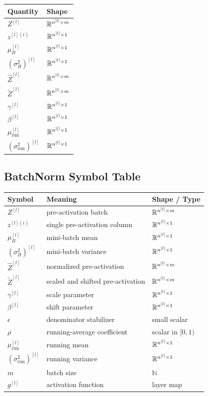 \begin{center}
\begin{tabular}{ll}
\toprule
Quantity & Shape \\
\midrule
$Z^{[l]}$ & $\mathbb{R}^{n^{[l]} \times m}$ \\
$z^{[l](i)}$ & $\mathbb{R}^{n^{[l]} \times 1}$ \\
$\mu_B^{[l]}$ & $\mathbb{R}^{n^{[l]} \times 1}$ \\
$(\sigma_B^2)^{[l]}$ & $\mathbb{R}^{n^{[l]} \times 1}$ \\
$\widehat{Z}^{[l]}$ & $\mathbb{R}^{n^{[l]} \times m}$ \\
$\widetilde{Z}^{[l]}$ & $\mathbb{R}^{n^{[l]} \times m}$ \\
$\gamma^{[l]}$ & $\mathbb{R}^{n^{[l]} \times 1}$ \\
$\beta^{[l]}$ & $\mathbb{R}^{n^{[l]} \times 1}$ \\
$\mu_{\mathrm{run}}^{[l]}$ & $\mathbb{R}^{n^{[l]} \times 1}$ \\
$(\sigma_{\mathrm{run}}^2)^{[l]}$ & $\mathbb{R}^{n^{[l]} \times 1}$ \\
\bottomrule
\end{tabular}
\end{center}

\subsection{BatchNorm Symbol Table}

\begin{center}
\begin{tabular}{lll}
\toprule
Symbol & Meaning & Shape / Type \\
\midrule
$Z^{[l]}$ & pre-activation batch & $\mathbb{R}^{n^{[l]} \times m}$ \\
$z^{[l](i)}$ & single pre-activation column & $\mathbb{R}^{n^{[l]} \times 1}$ \\
$\mu_B^{[l]}$ & mini-batch mean & $\mathbb{R}^{n^{[l]} \times 1}$ \\
$(\sigma_B^2)^{[l]}$ & mini-batch variance & $\mathbb{R}^{n^{[l]} \times 1}$ \\
$\widehat{Z}^{[l]}$ & normalized pre-activation & $\mathbb{R}^{n^{[l]} \times m}$ \\
$\widetilde{Z}^{[l]}$ & scaled and shifted pre-activation & $\mathbb{R}^{n^{[l]} \times m}$ \\
$\gamma^{[l]}$ & scale parameter & $\mathbb{R}^{n^{[l]} \times 1}$ \\
$\beta^{[l]}$ & shift parameter & $\mathbb{R}^{n^{[l]} \times 1}$ \\
$\epsilon$ & denominator stabilizer & small scalar \\
$\rho$ & running-average coefficient & scalar in $[0,1)$ \\
$\mu_{\mathrm{run}}^{[l]}$ & running mean & $\mathbb{R}^{n^{[l]} \times 1}$ \\
$(\sigma_{\mathrm{run}}^2)^{[l]}$ & running variance & $\mathbb{R}^{n^{[l]} \times 1}$ \\
$m$ & batch size & $\mathbb{N}$ \\
$g^{[l]}$ & activation function & layer map \\
\bottomrule
\end{tabular}
\end{center}
